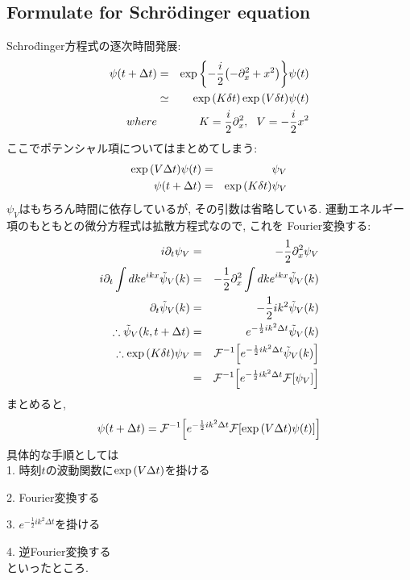 \documentclass[10.5pt,a4paper]{jreport}
\begin{document}
\subsection{Formulate for Schr\"odinger equation}
Schro\"dinger方程式の逐次時間発展:
\begin{eqnarray}
  \psi(t + \Delta t) &=& \exp\qty{-\frac{i}{2}\qty(-\partial_x^2 + x^2)}\psi(t)\\
  &\simeq& \exp\qty(K\delta t)\exp\qty(V\delta t)\psi(t)\\
\nonumber   where&&\ \ K = \frac{i}{2}\partial_x^2,\ \ V = - \frac{i}{2}x^2
\end{eqnarray}
ここでポテンシャル項についてはまとめてしまう:
\begin{eqnarray}
  \exp\qty(V\Delta t)\psi(t) &=& \psi_V\\
  \psi(t + \Delta t) &=& \exp\qty(K\delta t)\psi_V
\end{eqnarray}
$\psi_V$はもちろん時間に依存しているが, その引数は省略している. 運動エネルギー項のもともとの微分方程式は拡散方程式なので, これを Fourier変換する:
\begin{eqnarray}
  i\partial_t \psi_V &=& -\frac{1}{2}\partial_x^2 \psi_V\\
  i\partial_t\int dk e^{ikx}\tilde{\psi}_V(k) &=& -\frac{1}{2}\partial_x^2 \int dk e^{ikx}\tilde{\psi}_V(k)\\
  \partial_t \tilde{\psi}_V(k) &=& -\frac{1}{2} ik^2\tilde{\psi}_V(k)\\
  \therefore \tilde{\psi}_V(k, t+\Delta t) &=& e^{-\frac{1}{2} ik^2\Delta t}\tilde{\psi}_V(k)\\
\nonumber  \therefore \exp\qty(K\delta t)\psi_V &=& {\cal F}^{-1}\qty[e^{-\frac{1}{2} ik^2\Delta t}\tilde{\psi}_V(k)]\\
  &=& {\cal F}^{-1}\qty[e^{-\frac{1}{2} ik^2\Delta t}{\cal F}\qty[\psi_V]]
\end{eqnarray}
まとめると,
\begin{eqnarray}
  \psi(t+\Delta t) = {\cal F}^{-1}\qty[e^{-\frac{1}{2} ik^2\Delta t}{\cal F}\qty[\exp\qty(V\Delta t)\psi(t)]]
\end{eqnarray}
具体的な手順としては\\

1. 時刻$t$の波動関数に$\exp\qty(V\Delta t)$を掛ける

2. Fourier変換する

3. $e^{-\frac{1}{2} ik^2\Delta t}$を掛ける

4. 逆Fourier変換する\\

といったところ.
\end{document}
